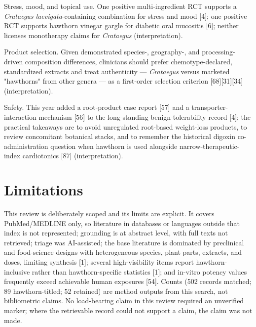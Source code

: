 \documentclass[11pt]{article}
\begin{document}
Stress, mood, and topical use. One positive multi-ingredient RCT supports a \emph{Crataegus laevigata}-containing combination for stress and mood [4]; one positive RCT supports hawthorn vinegar gargle for diabetic oral mucositis [6]; neither licenses monotherapy claims for \emph{Crataegus} (interpretation).

Product selection. Given demonstrated species-, geography-, and processing-driven composition differences, clinicians should prefer chemotype-declared, standardized extracts and treat authenticity --- \emph{Crataegus} versus marketed "hawthorns" from other genera --- as a first-order selection criterion [68][31][34] (interpretation).

Safety. This year added a root-product case report [57] and a transporter-interaction mechanism [56] to the long-standing benign-tolerability record [4]; the practical takeaways are to avoid unregulated root-based weight-loss products, to review concomitant botanical stacks, and to remember the historical digoxin co-administration question when hawthorn is used alongside narrow-therapeutic-index cardiotonics [87] (interpretation).

\section*{Limitations}
This review is deliberately scoped and its limits are explicit. It covers PubMed/MEDLINE only, so literature in databases or languages outside that index is not represented; grounding is at abstract level, with full texts not retrieved; triage was AI-assisted; the base literature is dominated by preclinical and food-science designs with heterogeneous species, plant parts, extracts, and doses, limiting synthesis [1]; several high-visibility items report hawthorn-inclusive rather than hawthorn-specific statistics [1]; and in-vitro potency values frequently exceed achievable human exposures [54]. Counts (502 records matched; 89 hawthorn-titled; 52 retained) are method outputs from this search, not bibliometric claims. No load-bearing claim in this review required an unverified marker; where the retrievable record could not support a claim, the claim was not made.
\end{document}
